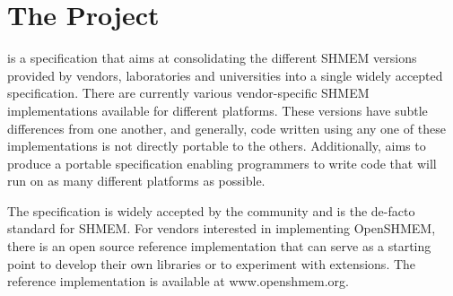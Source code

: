 
\section{The \openshmem{} Project}

\openshmem{} is a specification that aims at consolidating the different
SHMEM versions provided by vendors, laboratories and universities 
into a single widely accepted specification. There are currently various vendor-specific SHMEM implementations available for
different platforms. These versions have subtle differences from one
another, and generally, code written using any one of these
implementations is not directly portable to the others. Additionally, \openshmem{} aims
to produce a portable specification enabling programmers to write
\openshmem{} code that will run on as many different platforms
as possible.

The \openshmem{} specification is widely accepted by the community and is the de-facto
standard for SHMEM.  For vendors interested in implementing OpenSHMEM, there is an open source reference implementation
that can serve as a starting point to develop their own libraries or to experiment with extensions. The reference implementation is available at www.openshmem.org.
